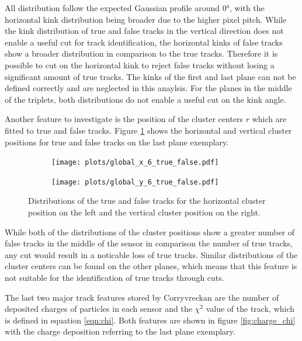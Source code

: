 All distribution follow the expected Gaussian profile around 0°, with the horizontal kink distribution being broader due to the higher pixel pitch.
While the kink distribution of true and false tracks in the vertical direction does not enable a useful
cut for track identification, the horizontal kinks of false tracks show a broader distribution in comparison to the true tracks. Therefore it is
possible to cut on the horizontal kink to reject false tracks without losing a significant amount of true tracks.
The kinks of the first and last plane can not be defined correctly and are neglected in this anaylsis. For the planes in the middle of the triplets, both
distributions do not enable a useful cut on the kink angle.

Another feature to investigate is the position of the cluster centers $r$ which are fitted to true and false tracks. Figure \ref{fig:clus_pos} shows the
horizontal and vertical cluster positions for true and false tracks on the last plane exemplary.

\begin{figure}
  \hspace{-2.5cm}
  \begin{subfigure}{0.62\textwidth}
      \centering
      \texttt{[image: plots/global\_x\_6\_true\_false.pdf]}
  \end{subfigure}
  \begin{subfigure}{0.62\textwidth}
      \hspace{0.95cm}
      \texttt{[image: plots/global\_y\_6\_true\_false.pdf]}
  \end{subfigure}
  \caption{Distributions of the true and false tracks for the horizontal cluster position on the left and the vertical cluster position on the right.}
  \label{fig:clus_pos}
\end{figure}

While both of the distributions of the cluster positions show a greater number of false tracks in the middle of the sensor in comparison the number of true tracks,
any cut would result in a noticable loss of true tracks. Similar distributions of the cluster centers can be found on the other planes, which means that this feature
is not suitable for the identification of true tracks through cuts.

The last two major track features stored by Corryvreckan are the number of deposited charges of particles in each sensor and the $\chi^2$ value of the track,
which is defined in equation \ref{eqn:chi}.
Both features are shown in figure \ref{fig:charge_chi} with the charge deposition referring to the last plane exemplary.

